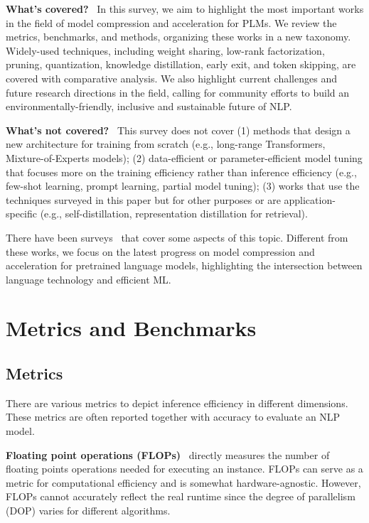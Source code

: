 \documentclass[letterpaper]{article}
\newcommand{\eg}{e.g.,\xspace}
\newcommand{\paratitle}[1]{\noindent\textbf{#1}\ }
\begin{document}
\paratitle{What's covered?} In this survey, we aim to highlight the most important works in the field of model compression and acceleration for PLMs. We review the metrics, benchmarks, and methods, organizing these works in a new taxonomy. Widely-used techniques, including weight sharing, low-rank factorization, pruning, quantization, knowledge distillation, early exit, and token skipping, are covered with comparative analysis. We also highlight current challenges and future research directions in the field, calling for community efforts to build an environmentally-friendly, inclusive and sustainable future of NLP.

\paratitle{What's not covered?} This survey does not cover (1) methods that design a new architecture for training from scratch (\eg long-range Transformers, Mixture-of-Experts models); (2) data-efficient or parameter-efficient model tuning that focuses more on the training efficiency rather than inference efficiency (\eg few-shot learning, prompt learning, partial model tuning); (3) works that use the techniques surveyed in this paper but for other purposes or are application-specific (\eg self-distillation, representation distillation for retrieval).

There have been surveys~\citep{qiu2020pre,han2021pre,xu2021survey} that cover some aspects of this topic. Different from these works, we focus on the latest progress on model compression and acceleration for pretrained language models, highlighting the intersection between language technology and efficient ML.




\section{Metrics and Benchmarks}

\subsection{Metrics}
\label{sec:metrics}

There are various metrics to depict inference efficiency in different dimensions. These metrics are often reported together with accuracy to evaluate an NLP model.


\paratitle{Floating point operations (FLOPs)} directly measures the number of floating points operations needed for executing an instance. FLOPs can serve as a metric for computational efficiency and is somewhat hardware-agnostic. However, FLOPs cannot accurately reflect the real runtime since the degree of parallelism (DOP) varies for different algorithms.
\end{document}
